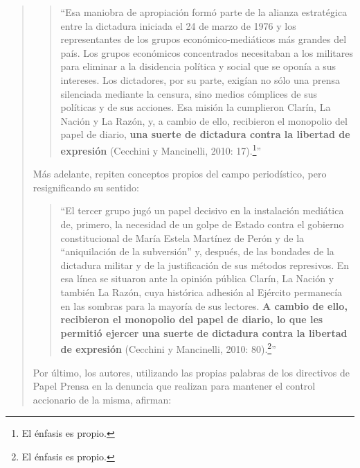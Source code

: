 \begin{quote}
\begin{quote}
	\enquote{Esa maniobra de apropiación formó parte de la alianza estratégica entre la dictadura iniciada el 24 de marzo de 1976 y los representantes de los grupos económico-mediáticos más grandes del país. Los grupos económicos concentrados necesitaban a los militares para eliminar a la disidencia política y social que se oponía a sus intereses. Los dictadores, por su parte, exigían no sólo una prensa silenciada mediante la censura, sino medios cómplices de sus políticas y de sus acciones. Esa misión la cumplieron Clarín, La Nación y La Razón, y, a cambio de ello, recibieron el monopolio del papel de diario, \textbf{una suerte de dictadura contra la libertad de expresión} (Cecchini y Mancinelli, 2010: 17).\footnote{El énfasis es propio.}}
\end{quote}


Más adelante, repiten conceptos propios del campo periodístico, pero resignificando su sentido:

\begin{quote}
	\enquote{El tercer grupo  jugó un papel decisivo en la instalación mediática de, primero, la necesidad de un golpe de Estado contra el gobierno constitucional de María Estela Martínez de Perón y de la ``aniquilación de la subversión'' y, después, de las bondades de la dictadura militar y de la justificación de sus métodos represivos. En esa línea se situaron  ante la opinión pública Clarín, La Nación y también La Razón, cuya histórica adhesión al Ejército permanecía en las sombras para la mayoría de sus lectores. \textbf{A cambio de ello, recibieron el monopolio del papel de diario, lo que les permitió ejercer}  \textbf{una suerte de dictadura contra la libertad de expresión }(Cecchini y Mancinelli, 2010: 80).\footnote{El énfasis es propio.}}
\end{quote}


Por último, los autores, utilizando las propias palabras de los directivos de Papel Prensa en la denuncia que realizan para mantener el control accionario de la misma, afirman:


\end{quote}
